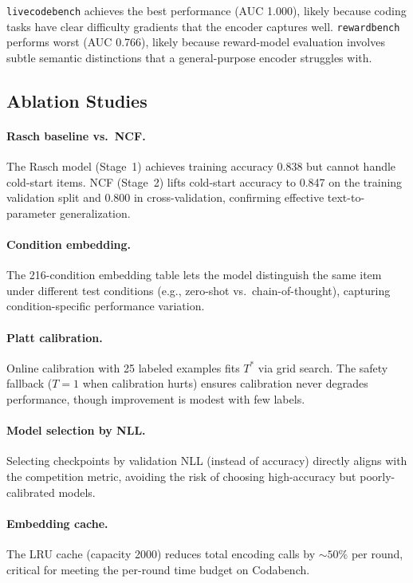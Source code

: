 \documentclass{article}
\begin{document}
\texttt{livecodebench} achieves the best performance (AUC 1.000), likely because coding tasks have clear difficulty gradients that the encoder captures well.
\texttt{rewardbench} performs worst (AUC 0.766), likely because reward-model evaluation involves subtle semantic distinctions that a general-purpose encoder struggles with.

\subsection{Ablation Studies}

\paragraph{Rasch baseline vs.\ NCF.}
The Rasch model (Stage~1) achieves training accuracy 0.838 but cannot handle cold-start items.
NCF (Stage~2) lifts cold-start accuracy to 0.847 on the training validation split and 0.800 in cross-validation, confirming effective text-to-parameter generalization.

\paragraph{Condition embedding.}
The 216-condition embedding table lets the model distinguish the same item under different test conditions (e.g., zero-shot vs.\ chain-of-thought), capturing condition-specific performance variation.

\paragraph{Platt calibration.}
Online calibration with 25 labeled examples fits $T^*$ via grid search.
The safety fallback ($T{=}1$ when calibration hurts) ensures calibration never degrades performance, though improvement is modest with few labels.

\paragraph{Model selection by NLL.}
Selecting checkpoints by validation NLL (instead of accuracy) directly aligns with the competition metric, avoiding the risk of choosing high-accuracy but poorly-calibrated models.

\paragraph{Embedding cache.}
The LRU cache (capacity 2000) reduces total encoding calls by ${\sim}50\%$ per round, critical for meeting the per-round time budget on Codabench.
\end{document}
